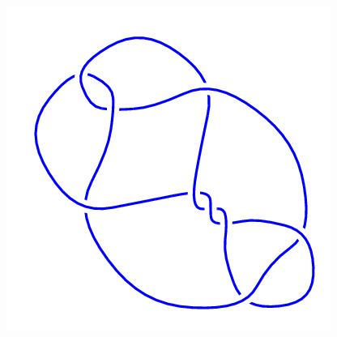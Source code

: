 \begin{figure}[H]
\begin{minipage}[b]{.18\linewidth}
	\end{minipage}
	\begin{minipage}[b]{.18\linewidth}
		\centering
		\includegraphics[width=\linewidth]{../data/9_15.png}
	\end{minipage}
\end{figure}
